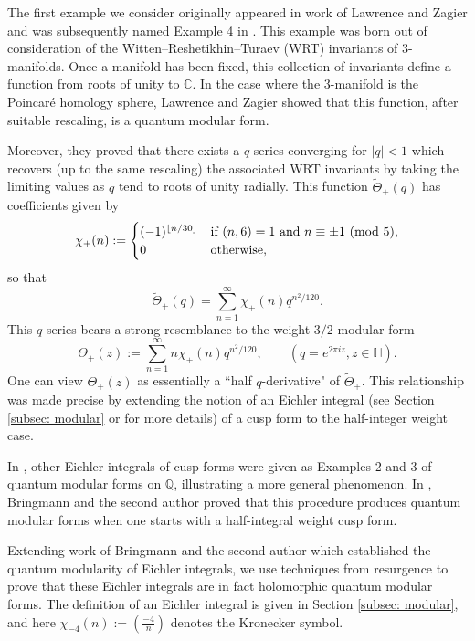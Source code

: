 \documentclass[12pt]{amsart}
\theoremstyle{definition}
\theoremstyle{plain}
\renewcommand{\pmod}[1]{\,\,({\rm mod}\,\,{#1})}
\numberwithin{equation}{section}
\begin{document}
The first example we consider originally appeared in work of Lawrence and Zagier \cite{lawrence-zagier} and was subsequently named Example 4 in \cite{zagier-quantum}. This example was born out of consideration of the Witten--Reshetikhin--Turaev (WRT) invariants of 3-manifolds. Once a manifold has been fixed, this collection of invariants define a function from roots of unity to $\mathbb{C}$.  In the case where the 3-manifold is the Poincar\'e homology sphere, Lawrence and Zagier
showed that this function, after suitable rescaling, is a quantum modular form. 

Moreover, they proved that there exists a $q$-series converging for $|q|<1$ which recovers (up to the same rescaling) the associated WRT invariants by taking the limiting values as $q$ tend to roots of unity radially. This function $\widetilde{\Theta}_+(q)$ has coefficients given by
\[\chi_+(n) := \begin{cases}
 	(-1)^{\lfloor n/30\rfloor} & \text{if } (n, 6) = 1 \text{ and } n \equiv \pm 1 \pmod{5},\\
 	0 & \text{otherwise,}
 \end{cases}
\]
so that
\[\widetilde{\Theta}_+(q) = \sum_{n=1}^\infty \chi_+(n)q^{n^2/120}.
\]
This $q$-series bears a strong resemblance to the weight $3/2$ modular form
\[\Theta_+(z) := \sum_{n=1}^\infty n\chi_+(n)q^{n^2/120}, \quad \quad (q = e^{2\pi i z}, z \in \mathbb{H}).
\]
One can view $\Theta_+(z)$ as essentially a ``half $q$-derivative" of $\widetilde{\Theta}_+$. 
This relationship was made precise by extending the notion of an Eichler integral (see Section \ref{subsec: modular} or\cite{eichler, shimura, manin} for more details) of a cusp form to the half-integer weight case. 

 
In \cite{zagier-quantum}, other Eichler integrals of cusp forms were given as Examples 2 and 3 of quantum modular forms on $\mathbb{Q}$, illustrating a more general phenomenon.  
In \cite{bringmann-rolen}, Bringmann and the second author proved that this procedure produces quantum modular forms when one starts with a half-integral weight cusp form. 

Extending work of Bringmann and the second author which established the quantum modularity of Eichler integrals, we use techniques from resurgence to prove that these Eichler integrals are in fact holomorphic quantum modular forms. The definition of an Eichler integral is given in Section \ref{subsec: modular}, and here $\chi_{-4}(n) := \left( \frac{-4}{n}\right)$ denotes the Kronecker symbol. 
\end{document}
